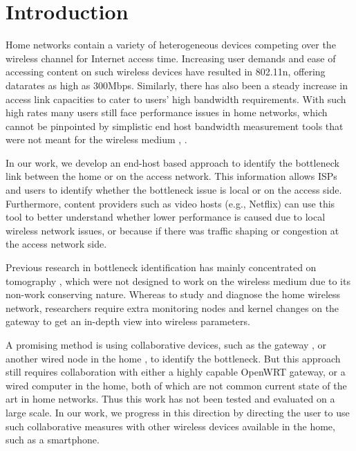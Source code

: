 \section{Introduction}

Home networks contain a variety of heterogeneous devices competing over the wireless channel for Internet access time. Increasing user demands and ease of accessing content on such wireless devices have resulted in 802.11n, offering datarates as high as 300Mbps. Similarly, there has also been a steady increase in access link capacities to cater to users' high bandwidth requirements. With such high rates many users still face performance issues in home networks, which cannot be pinpointed by simplistic end host bandwidth measurement tools that were not meant for the wireless medium \cite{speedtest}, \cite{netalyzr}.

In our work, we develop an end-host based approach to identify the bottleneck link between the home or on the access network. This information allows ISPs and users to identify whether the bottleneck issue is local or on the access side. Furthermore, content providers such as video hosts (e.g., Netflix) can use this tool to better understand whether lower performance is caused due to local wireless network issues, or because if there was traffic shaping or congestion at the access network side.

Previous research in bottleneck identification has mainly concentrated on tomography \cite{tools}, which were not designed to work on the wireless medium due to its non-work conserving nature. Whereas to study and diagnose the home wireless network, researchers require extra monitoring nodes and kernel changes on the gateway to get an in-depth view into wireless parameters.

A promising method is using collaborative devices, such as the gateway \cite{wtf}, or another wired node in the home \cite{wlanprobe}, to identify the bottleneck. But this approach still requires collaboration with either a highly capable OpenWRT gateway, or a wired computer in the home, both of which are not common current state of the art in home networks. Thus this work has not been tested and evaluated on a large scale. In our work, we progress in this direction by directing the user to use such collaborative measures with other wireless devices available in the home, such as a smartphone.


